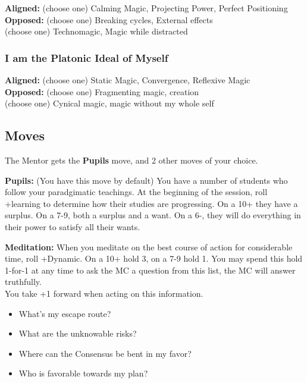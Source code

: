 \documentclass[
]{memoir}
\begin{document}
\textbf{Aligned:} (choose one) Calming Magic, Projecting Power, Perfect
Positioning\\
\textbf{Opposed:} (choose one) Breaking cycles, External effects\\
(choose one) Technomagic, Magic while distracted

\hypertarget{i-am-the-platonic-ideal-of-myself}{%
\subsubsection{I am the Platonic Ideal of
Myself}\label{i-am-the-platonic-ideal-of-myself}}

\textbf{Aligned:} (choose one) Static Magic, Convergence, Reflexive
Magic\\
\textbf{Opposed:} (choose one) Fragmenting magic, creation\\
(choose one) Cynical magic, magic without my whole self

\hypertarget{moves-1}{%
\subsection{Moves}\label{moves-1}}

The Mentor gets the \textbf{Pupils} move, and 2 other moves of your
choice.

\textbf{Pupils:} (You have this move by default) You have a number of
students who follow your paradgimatic teachings. At the beginning of the
session, roll +learning to determine how their studies are progressing.
On a 10+ they have a surplus. On a 7-9, both a surplus and a want. On a
6-, they will do everything in their power to satisfy all their wants.

\textbf{Meditation:} When you meditate on the best course of action for
considerable time, roll +Dynamic. On a 10+ hold 3, on a 7-9 hold 1. You
may spend this hold 1-for-1 at any time to ask the MC a question from
this list, the MC will answer truthfully.\\
You take +1 forward when acting on this information.

\begin{itemize}
\tightlist
\item
  What's my escape route?
\item
  What are the unknowable risks?
\item
  Where can the Consensus be bent in my favor?
\item
  Who is favorable towards my plan?
\end{itemize}
\end{document}
